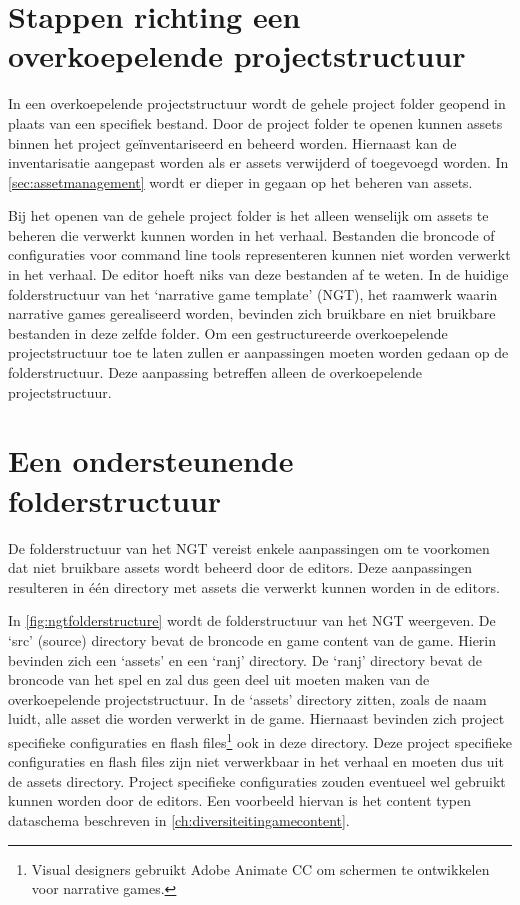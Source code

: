 \section{Stappen richting een overkoepelende projectstructuur}
In een overkoepelende projectstructuur wordt de gehele project folder geopend in plaats van een specifiek bestand. Door de project folder te openen kunnen assets binnen het project geïnventariseerd en beheerd worden. Hiernaast kan de inventarisatie aangepast worden als er assets verwijderd of toegevoegd worden. In \autoref{sec:assetmanagement} wordt er dieper in gegaan op het beheren van assets.

Bij het openen van de gehele project folder is het alleen wenselijk om assets te beheren die verwerkt kunnen worden in het verhaal. Bestanden die broncode of configuraties voor command line tools representeren kunnen niet worden verwerkt in het verhaal. De editor hoeft niks van deze bestanden af te weten. In de huidige folderstructuur van het ‘narrative game template’ (NGT), het raamwerk waarin narrative games gerealiseerd worden, bevinden zich bruikbare en niet bruikbare bestanden in deze zelfde folder. Om een gestructureerde overkoepelende projectstructuur toe te laten zullen er aanpassingen moeten worden gedaan op de folderstructuur. Deze aanpassing betreffen alleen de overkoepelende projectstructuur.

\section{Een ondersteunende folderstructuur}
De folderstructuur van het NGT vereist enkele aanpassingen om te voorkomen dat niet bruikbare assets wordt beheerd door de editors. Deze aanpassingen resulteren in één directory met assets die verwerkt kunnen worden in de editors.

In \autoref{fig:ngtfolderstructure} wordt de folderstructuur van het NGT weergeven. De ‘src’ (source) directory bevat de broncode en game content van de game. Hierin bevinden zich een ‘assets’ en een ‘ranj’ directory. De ‘ranj’ directory bevat de broncode van het spel en zal dus geen deel uit moeten maken van de overkoepelende projectstructuur. In de ‘assets’ directory zitten, zoals de naam luidt, alle asset die worden verwerkt in de game. Hiernaast bevinden zich project specifieke configuraties en flash files\footnote{Visual designers gebruikt Adobe Animate CC om schermen te ontwikkelen voor narrative games.} ook in deze directory. Deze project specifieke configuraties en flash files zijn niet verwerkbaar in het verhaal en moeten dus uit de assets directory. Project specifieke configuraties zouden eventueel wel gebruikt kunnen worden door de editors. Een voorbeeld hiervan is het content typen dataschema beschreven in \autoref{ch:diversiteitingamecontent}. 

